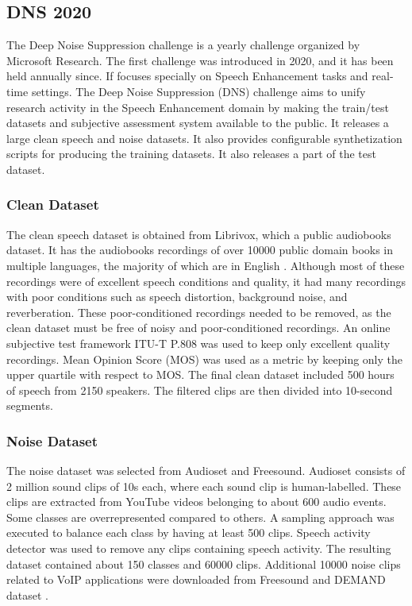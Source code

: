 \subsection{DNS 2020 \cite{reddy2020}}
The Deep Noise Suppression challenge is a yearly challenge organized by Microsoft Research. The first challenge was introduced in 2020, and it has been held annually since. If focuses specially on Speech Enhancement tasks and real-time settings. The Deep Noise Suppression (DNS) challenge aims to unify research activity in the Speech Enhancement domain by making the train/test datasets and subjective assessment system available to the public. It releases a large clean speech and noise datasets. It also provides configurable synthetization scripts for producing the training datasets. It also releases a part of the test dataset.

\subsubsection{Clean Dataset}
The clean speech dataset is obtained from Librivox, which a public audiobooks dataset. It has the audiobooks recordings of over 10000 public domain books in multiple languages, the majority of which are in English \cite{panayotov2015}. Although most of these recordings were of excellent speech conditions and quality, it had many recordings with poor conditions such as speech distortion, background noise, and reverberation. These poor-conditioned recordings needed to be removed, as the clean dataset must be free of noisy and poor-conditioned recordings. An online subjective test framework ITU-T P.808 was used to keep only excellent quality recordings. Mean Opinion Score (MOS) was used as a metric by keeping only the upper quartile with respect to MOS. The final clean dataset included 500 hours of speech from 2150 speakers. The filtered clips are then divided into 10-second segments.

\subsubsection{Noise Dataset}
The noise dataset was selected from Audioset \cite{gemmeke2017} and Freesound. Audioset consists of 2 million sound clips of 10s each, where each sound clip is human-labelled. These clips are extracted from YouTube videos belonging to about 600 audio events. Some classes are overrepresented compared to others. A sampling approach was executed to balance each class by having at least 500 clips. Speech activity detector was used to remove any clips containing speech activity. The resulting dataset contained about 150 classes and 60000 clips. Additional 10000 noise clips related to VoIP applications were downloaded from Freesound and DEMAND dataset \cite{thiemann2013}.

